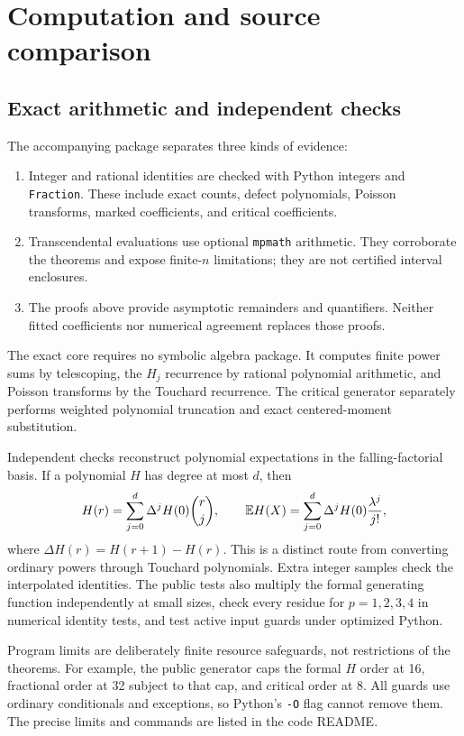 \section{Computation and source comparison}
\subsection{Exact arithmetic and independent checks}
The accompanying package separates three kinds of evidence:
\begin{enumerate}[leftmargin=*,itemsep=3pt]
 \item Integer and rational identities are checked with Python integers and
 \texttt{Fraction}. These include exact counts, defect polynomials,
 Poisson transforms, marked coefficients, and critical coefficients.
 \item Transcendental evaluations use optional \texttt{mpmath} arithmetic.
 They corroborate the theorems and expose finite-$n$ limitations; they
 are not certified interval enclosures.
 \item The proofs above provide asymptotic remainders and quantifiers.
 Neither fitted coefficients nor numerical agreement replaces those proofs.
\end{enumerate}
The exact core requires no symbolic algebra package. It computes finite
power sums by telescoping, the $H_j$ recurrence by rational polynomial
arithmetic, and Poisson transforms by the Touchard recurrence.
The critical generator separately performs weighted polynomial truncation
and exact centered-moment substitution.

Independent checks reconstruct polynomial expectations in the
falling-factorial basis. If a polynomial $H$ has degree at most $d$, then
\begin{equation}\label{spb:ep:eq:diffbasis}
 H(r)=\sum_{j=0}^d\Delta^jH(0)\binom rj,
 \qquad \mathbb E H(X)=\sum_{j=0}^d\Delta^jH(0)\frac{\lambda^j}{j!},
\end{equation}
where $\Delta H(r)=H(r+1)-H(r)$.
This is a distinct route from converting ordinary powers through Touchard
polynomials. Extra integer samples check the interpolated identities.
The public tests also multiply the formal generating function independently
at small sizes, check every residue for $p=1,2,3,4$ in numerical identity
tests, and test active input guards under optimized Python.

Program limits are deliberately finite resource safeguards, not restrictions
of the theorems. For example, the public generator caps the formal $H$ order
at 16, fractional order at 32 subject to that cap, and critical order at 8.
All guards use ordinary conditionals and exceptions, so Python's
\texttt{-O} flag cannot remove them. The precise limits and commands are
listed in the code README.

